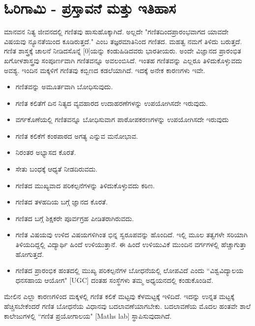 \section{ಓರಿಗಾಮಿ - ಪ್ರಸ್ತಾವನೆ ಮತ್ತು ಇತಿಹಾಸ }\label{sec1.1}
 
 ಮಾನವನ ನಿತ್ಯ ಜೀವನದಲ್ಲಿ ಗಣಿತವು ಹಾಸುಹೊಕ್ಕಾಗಿದೆ. ಅಲ್ಲದೇ "ಗಣಿತದಿಂದ\break ಪ್ರಾರಂಭವಾಗದ ಯಾವದೇ ವಿಷಯವು ನ್ಯೂನತೆಯಿಂದ ಕೂಡಿರುತ್ತದೆ." ಎಂಬ ತಜ್ಞರ\break ಮಾತಿನಿಂದ ಗಣಿತದ. ಮಹತ್ವ ನಮಗೆ ತಿಳಿದು ಬರುತ್ತದೆ. ಗಣಿತ ಶಾಸ್ತ್ರಕ್ಕೆ  ಚಾಲನೆ ನೀಡಿದ\break ಸೊನ್ನೆ [0]ಯನ್ನು ಕಂಡುಹಿಡಿದವರು ಭಾರತೀಯರು. ಅಂದೇ ವಿಜ್ಞಾನದ ಪ್ರಾರಂಭಿತ ಖಗೋಳಶಾಸ್ತ್ರವು ಸಂಪೂರ್ಣವಾಗಿ ಗಣಿತವನ್ನೂ ಅವಲಂಬಿಸಿದೆ. ಇಂತಹ ಗಣಿತವನ್ನು ಎಲ್ಲರೂ ತಿಳಿದುಕೊಳ್ಳುವದು ಅವಶ್ಯ. ಇಂದಿನ ಮಕ್ಕಳಿಗೆ ಗಣಿತವು ಕಬ್ಬಿಣದ ಕಡಲೆಯಾಗಿದೆ. ಇದಕ್ಕೆ ಅನೇಕ ಕಾರಣಗಳು ಇವೇ. 
  \begin{itemize} 
 \itemsep=2pt
 \item ಗಣಿತವನ್ನು ಅಮೂರ್ತವಾಗಿ ಬೋಧಿಸುವುದು. 
 
 \item ಗಣಿತ ಕಲಿತೆಗೆ ದಿನ ನಿತ್ಯದ ವ್ಯವಹಾರದ ಉದಾಹರಣೆಗಳನ್ನು ಉಪಯೋಗಿಸದೇ ಇರುವುದು.
 
 \item ವರ್ಗಕೊಣೆಯಲ್ಲಿ ಗಣಿತವನ್ನೂ ಬೋಧಿಸುವಾಗ ಪಾಠೋಪಕರಣಗಳನ್ನು ಉಪಯೋಗಿಸದೇ ಇರುವುದು
 
 \item ಗಣಿತ ಕಲಿಕೆಗೆ ಕಂಠಪಾಠದ ಅಗತ್ಯ ಎನ್ನುವ ಮನೋಭಾವ.

\item ನಿರಂತರ ಅಭ್ಯಾಸದ ಕೊರತೆ.
 
 \item  ಸೇತು ಬಂಧಕ್ಕೆ ಆಧ್ಯತೆ ನೀಡದಿರುವದು.
 
 \item ಗಣಿತದ ಮುಖ್ಯವಾದ ಪರಿಕಲ್ಪನೆಗಳನ್ನು ತಿಳಿದುಕೊಳ್ಳುವದು ಕಠಿಣ.
 
 \item ಗಣಿತದ ತಳಹದಿಯ ಬಗ್ಗೆ ಜ್ಞಾನದ ಕೊರತೆ. 
 
 \item ಗಣಿತದ ಬಗ್ಗೆ ಶಿಕ್ಷಕರೇ ಪೂರ್ವಗ್ರಹ ಪೀಡಿತರಾಗಿರುವದು.
 
 \item ಗಣಿತ ವಿಷಯವು ಉಳಿದ ವಿಷಯಗಳಿಗಿಂತ ಭಿನ್ನ ಸ್ವರೂಪವನ್ನು ಹೊಂದಿದೆ. ಇಲ್ಲಿ ಮೂಲ ತತ್ವಗಳೇ ಸರಿಯಾಗಿ ತಿಳಿಯದಿದ್ದಲ್ಲಿ ವಿದ್ಯಾರ್ಥಿ ಹಿಂದೆ ಉಳಿಯುತ್ತಾನೆ. ಈ ಹಿಂದೆ ಉಳಿಯುವಿಕೆ ಮುಂದಿನ ವರ್ಗಗಳಲ್ಲಿ ಹೆಚ್ಚಾಗುತ್ತಾ ಹೋಗುತ್ತದೆ. 
  
 \item ಗಣಿತದ ಪ್ರಾರಂಭಿಕ ಹಂತದಲ್ಲಿ ಮುಖ್ಯ ಪರಿಕಲ್ಪನೆಗಳ ಬೋಧನೆಯಲ್ಲಿ ಲೋಪ\break ವಿದೆ ಎಂದು ``ವಿಶ್ವವಿದ್ಯಾಲಯ ಧನಸಹಾಯ ಆಯೋಗ" [UGC] ದಂತಹ ಸಂಸ್ಥೆ\break ಗಳು ತಮ್ಮ ಅಧ್ಯಯನದಲ್ಲಿ ಕಂಡುಕೊಂಡಿವೆ. 
 \end{itemize}
 
 ಮೇಲಿನ ಎಲ್ಲಾ ಕಾರಣಗಳಿಂದ ಮಕ್ಕಳಲ್ಲಿ ಗಣಿತ ಕಲಿಕೆ ಮಟ್ಟವು ಕೆಳಮಟ್ಟಕ್ಕೆ  ಇಳಿದಿದೆ. ಇದನ್ನು ಉನ್ನತ ಮಟ್ಟಕ್ಕೆ ಹೆಚ್ಚಿಸಬೇಕೆಂದರೆ ಗಣಿತ ಬೋಧನೆಯ ವಿಧಾನವು ಬದಲಾವಣೆಯಾಗಬೇಕು. ಬದಲಾವಣೆಯ ಮೊದಲ ಹಂತವೇ ಶಾಲೆ ಕಾಲೇಜುಗಳಲ್ಲಿ ``ಗಣಿತ ಪ್ರಯೋಗಾಲಯ" [Maths lab] ಸ್ಥಾಪಿಸುವುದಾಗಿದೆ.
  
